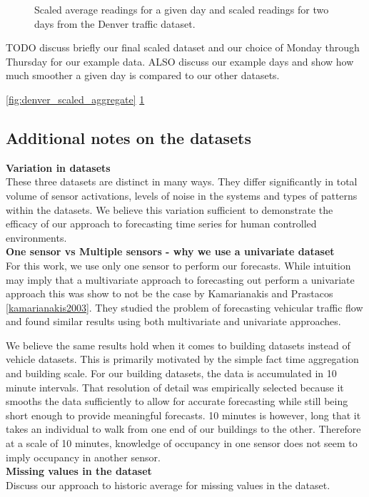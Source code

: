 \begin{figure}[h]
	\begin{center}
		\label{fig:denver_scaled_aggregate}
		\label{fig:denver_scaled_raw}
	\end{center}
	\caption{Scaled average readings for a given day and scaled readings for two days from the Denver traffic dataset.}
\end{figure}

TODO discuss briefly our final scaled dataset and our choice of Monday through Thursday for our example data.  ALSO discuss our example days and show how much smoother a given day is compared to our other datasets.

\ref{fig:denver_scaled_aggregate}
\ref{fig:denver_scaled_raw}

\subsection{Additional notes on the datasets} 

\noindent
\textbf{Variation in datasets} \\
These three datasets are distinct in many ways.  They differ significantly in total volume of sensor activations, levels of noise in the systems and types of patterns within the datasets.  We believe this variation sufficient to demonstrate the efficacy of our approach to forecasting time series for human controlled environments. \\

\noindent
\textbf{One sensor vs Multiple sensors - why we use a univariate dataset} \\
For this work, we use only one sensor to perform our forecasts.  While intuition may imply that a multivariate approach to forecasting out perform a univariate approach this was show to not be the case by Kamarianakis and Prastacos \ref{kamarianakis2003}.  They studied the problem of forecasting vehicular traffic flow and found similar results using both multivariate and univariate approaches.

We believe the same results hold when it comes to building datasets instead of vehicle datasets.  This is primarily motivated by the simple fact time aggregation and building scale.  For our building datasets, the data is accumulated in 10 minute intervals.  That resolution of detail was empirically selected because it smooths the data sufficiently to allow for accurate forecasting while still being short enough to provide meaningful forecasts.  10 minutes is however, long that it takes an individual to walk from one end of our buildings to the other.  Therefore at a scale of 10 minutes, knowledge of occupancy in one sensor does not seem to imply occupancy in another sensor. \\

\noindent
\textbf{Missing values in the dataset} \\
Discuss our approach to historic average for missing values in the dataset.




